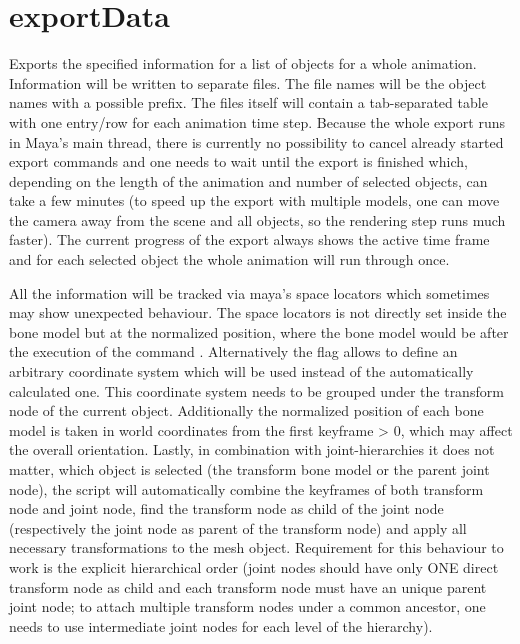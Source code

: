 \documentclass[letterpaper,10pt,english]{sphinxmanual}
\begin{document}
\section{exportData}
\label{\detokenize{pk_src.exportData:exportdata}}\label{\detokenize{pk_src.exportData::doc}}\label{\detokenize{pk_src.exportData:id1}}
{\hyperref[\detokenize{index:commands}]{}}
\label{\detokenize{pk_src.exportData:module-pk_src.exportData}}
Exports the specified information for a list of objects for a whole animation. Information will be written to separate files. The file names will be the object names with a possible prefix. The files itself will contain a tab-separated table with one entry/row for each animation time step. Because the whole export runs in Maya’s main thread, there is currently no possibility to cancel already started export commands and one needs to wait until the export is finished which, depending on the length of the animation and number of selected objects, can take a few minutes (to speed up the export with multiple models, one can move the camera away from the scene and all objects, so the rendering step runs much faster). The current progress of the export always shows the active time frame and for each selected object the whole animation will run through once.

All the information will be tracked via maya’s space locators which sometimes may show unexpected behaviour. The space locators is not directly set inside the bone model but at the normalized position, where the bone model would be after the execution of the command {\hyperref[\detokenize{pk_src.normalize:normalize}]{}}. Alternatively the flag  allows to define an arbitrary coordinate system which will be used instead of the automatically calculated one. This coordinate system needs to be grouped under the transform node of the current object. Additionally the normalized position of each bone model is taken in world coordinates from the first keyframe \textgreater{} 0, which may affect the overall orientation. Lastly, in combination with joint-hierarchies it does not matter, which object is selected (the transform bone model or the parent joint node), the script will automatically combine the keyframes of both transform node and joint node, find the transform node as child of the joint node (respectively the joint node as parent of the transform node) and apply all necessary transformations to the mesh object. Requirement for this behaviour to work is the explicit hierarchical order (joint nodes should have only ONE direct transform node as child and each transform node must have an unique parent joint node; to attach multiple transform nodes under a common ancestor, one needs to use intermediate joint nodes for each level of the hierarchy).
\end{document}
